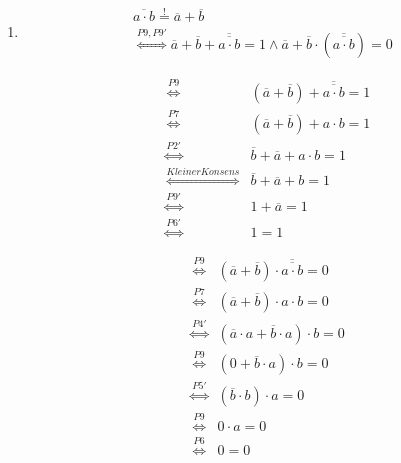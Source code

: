 \documentclass[a4paper]{article}
\begin{document}
\begin{enumerate}[label=\alph*)]
	\clearpage
	\item 
	\begin{equation}
	\begin{aligned}
		\overline{a \cdot b} \stackrel{!}{=} \overline{a} + \overline{b} \\
		\stackrel{P9, P9'}{\Longleftrightarrow} \overline{a} + \overline{b} + \overline{\overline{a \cdot b}} = 1 \wedge \overline{a} + \overline{b} \cdot (\overline{\overline{a \cdot b}}) = 0 
		\end{aligned}
	\end{equation}
	
	\begin{equation}
	\begin{aligned}
		&\stackrel{P9}{\Longleftrightarrow} &(\overline{a} + \overline{b}) + \overline{\overline{a \cdot b}} = 1 \\
		&\stackrel{P7}{\Longleftrightarrow} &(\overline{a} + \overline{b}) + a \cdot b = 1 \\
		&\stackrel{P2'}{\Longleftrightarrow} &\overline{b} + \overline{a} + a \cdot b = 1 \\
		&\stackrel{Kleiner Konsens}{\Longleftrightarrow} &\overline{b} + \overline{a} + b = 1 \\
		&\stackrel{P9'}{\Longleftrightarrow} &1 + \overline{a} = 1 \\
		&\stackrel{P6'}{\Longleftrightarrow} &1 = 1
	\end{aligned}
	\end{equation}
	
	\begin{equation}
	\begin{aligned}
		&\stackrel{P9}{\Longleftrightarrow} &(\overline{a} + \overline{b}) \cdot \overline{\overline{a \cdot b}} = 0 \\
		&\stackrel{P7}{\Longleftrightarrow}	 &(\overline{a} + \overline{b}) \cdot a \cdot b = 0 \\
		&\stackrel{P4'}{\Longleftrightarrow} &(\overline{a} \cdot a + \overline{b} \cdot a) \cdot b = 0 \\
		&\stackrel{P9}{\Longleftrightarrow} &(0 + \overline{b} \cdot a) \cdot b = 0 \\
		&\stackrel{P5'}{\Longleftrightarrow} &(\overline{b} \cdot b) \cdot a = 0 \\
		&\stackrel{P9}{\Longleftrightarrow} &0 \cdot a = 0 \\
		&\stackrel{P6}{\Longleftrightarrow} &0 = 0
		\end{aligned}
	\end{equation}
\end{enumerate}
\end{document}
